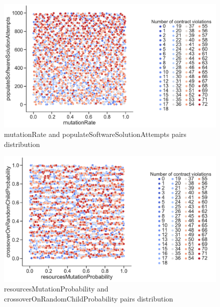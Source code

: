 \begin{figure}
	\centering
	\includegraphics[width=\textwidth]{images/PairsDistr/mutationRate_populateSoftwareSolutionAttempts.pdf}
	\caption[mutationRate and populateSoftwareSolutionAttempts pairs distribution]{mutationRate and populateSoftwareSolutionAttempts pairs distribution}
	\label{fig:mutationRate_populateSoftwareSolutionAttempts_pair}
\end{figure}
\begin{figure}
	\centering
	\includegraphics[width=\textwidth]{images/PairsDistr/resourcesMutationProbability_crossoverOnRandomChildProbability.pdf}
	\caption[resourcesMutationProbability and crossoverOnRandomChildProbability pairs distribution]{resourcesMutationProbability and crossoverOnRandomChildProbability pairs distribution}       
	\label{fig:resourcesMutationProbability_crossoverOnRandomChildProbability_pair}
\end{figure}
